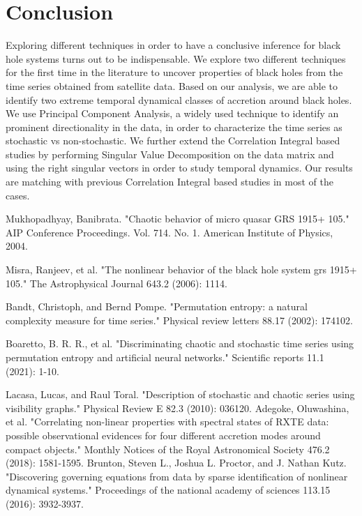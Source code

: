 \documentclass[10pt,conference]{IEEEtran}
\begin{document}
\section{Conclusion}
Exploring different techniques in order to have a conclusive inference for black hole systems turns out to be indispensable. We explore two different techniques for the first time in the literature to uncover  properties of black holes from the time series obtained from satellite data. Based on our analysis, we are able to identify two extreme temporal dynamical classes of accretion around black holes. We use Principal Component Analysis, a widely used technique to identify an prominent directionality in the data, in order to characterize the time series as stochastic vs non-stochastic. We further extend the Correlation Integral based studies by performing Singular Value Decomposition on the data matrix and using the right singular vectors in order to study temporal dynamics. Our results  are matching with previous Correlation Integral based studies in most of the cases.


\begin{thebibliography}{1}
 Mukhopadhyay, Banibrata. "Chaotic behavior of micro quasar GRS 1915+ 105." AIP Conference Proceedings. Vol. 714. No. 1. American Institute of Physics, 2004.

Misra, Ranjeev, et al. "The nonlinear behavior of the black hole system grs 1915+ 105." The Astrophysical Journal 643.2 (2006): 1114.

Bandt, Christoph, and Bernd Pompe. "Permutation entropy: a natural complexity measure for time series." Physical review letters 88.17 (2002): 174102.

Boaretto, B. R. R., et al. "Discriminating chaotic and stochastic time series using permutation entropy and artificial neural networks." Scientific reports 11.1 (2021): 1-10.

  Lacasa, Lucas, and Raul Toral. "Description of stochastic and chaotic series using visibility graphs." Physical Review E 82.3 (2010): 036120.
Adegoke, Oluwashina, et al. "Correlating non-linear properties with spectral states of RXTE data: possible observational evidences for four different accretion modes around compact objects." Monthly Notices of the Royal Astronomical Society 476.2 (2018): 1581-1595.
  Brunton, Steven L., Joshua L. Proctor, and J. Nathan Kutz. "Discovering governing equations from data by sparse identification of nonlinear dynamical systems." Proceedings of the national academy of sciences 113.15 (2016): 3932-3937.

\end{thebibliography}
\end{document}
